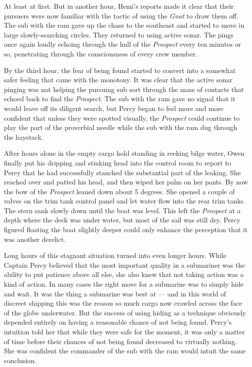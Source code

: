 \documentclass[]{scrbook}
\begin{document}
At least at first. But in another hour, Hemi's reports made it clear
that their pursuers were now familiar with the tactic of using the
\emph{Gnat} to draw them off. The sub with the ram gave up the chase to
the southeast and started to move in large slowly-searching circles.
They returned to using active sonar. The pings once again loudly echoing
through the hull of the \emph{Prospect} every ten minutes or so,
penetrating through the consciousness of every crew member.

By the third hour, the fear of being found started to convert into a
somewhat safer feeling that came with the monotony. It was clear that
the active sonar pinging was not helping the pursuing sub sort through
the mass of contacts that echoed back to find the \emph{Prospect}. The
sub with the ram gave no signal that it would leave off its diligent
search, but Percy began to feel more and more confident that unless they
were spotted visually, the \emph{Prospect} could continue to play the
part of the proverbial needle while the sub with the ram dug through the
haystack.

After hours alone in the empty cargo hold standing in reeking bilge
water, Owen finally put his dripping and stinking head into the control
room to report to Percy that he had successfully stanched the
substantial part of the leaking. She reached over and patted his head,
and then wiped her palm on her pants. By now the bow of the
\emph{Prospect} leaned down about 5 degrees. She opened a couple of
valves on the trim tank control panel and let water flow into the rear
trim tanks. The stern sank slowly down until the boat was level. This
left the \emph{Prospect} at a depth where the deck was under water, but
most of the sail was still dry. Percy figured floating the boat slightly
deeper could only enhance the perception that it was another derelict.

Long hours of this stagnant situation turned into even longer hours.
While Captain Percy believed that the most important quality in a
submariner was the ability to put patience above all else, she also knew
that not taking action was a kind of action. In many cases the right
move for a submarine was to simply hide and wait. It was the thing a
submarine was best at --- and in this world of discreet shipping this
was the reason so much cargo now crawled across the face of the globe
underwater. But the success of using hiding as a technique obviously
depended entirely on having a reasonable chance of not being found.
Percy's intuition told her that while they were safe for the moment, it
was only a matter of time before their chances of not being found
decreased to virtually nothing. She was confident the commander of the
sub with the ram would intuit the same conclusion.
\end{document}
